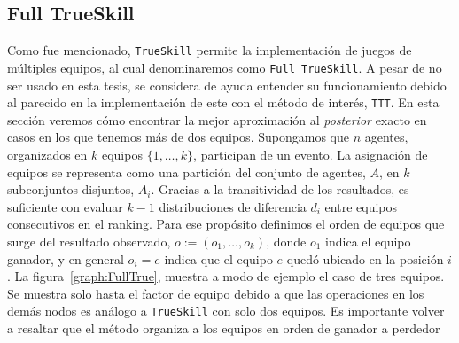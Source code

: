 \documentclass[11pt,twoside,spanish]{report} %
\begin{document}
\subsection{Full TrueSkill}\label{sec:iterative_posterior}
Como fue mencionado, \texttt{TrueSkill} permite la implementaci\'on de juegos de m\'ultiples equipos, al cual denominaremos como \texttt{Full TrueSkill}.
A pesar de no ser usado en esta tesis, se considera de ayuda entender su funcionamiento debido al parecido en la implementaci\'on de este con el m\'etodo de inter\'es, \texttt{TTT}.
En esta secci\'on veremos c\'omo encontrar la mejor aproximaci\'on al \textit{posterior} exacto en casos en los que tenemos m\'as de dos equipos.
Supongamos que $n$ agentes, organizados en $k$ equipos $\{1, \dots, k\}$, participan de un evento. 
La asignaci\'on de equipos se representa como una partici\'on del conjunto de agentes, $A$, en $k$ subconjuntos disjuntos, $A_i$.
Gracias a la transitividad de los resultados, es suficiente con evaluar $k-1$ distribuciones de diferencia $d_i$ entre equipos consecutivos en el ranking.
Para ese prop\'osito definimos el orden de equipos que surge del resultado observado, $o := (o_1, \dots, o_k)$, donde $o_1$ indica el equipo ganador, y en general $o_i = e$ indica que el equipo $e$ qued\'o ubicado en la posici\'on $i$.
La figura~\ref{graph:FullTrue}, muestra a modo de ejemplo el caso de tres equipos.
Se muestra solo hasta el factor de equipo debido a que las operaciones en los dem\'as nodos es an\'alogo a \texttt{TrueSkill} con solo dos equipos.
Es importante volver a resaltar que el m\'etodo organiza a los equipos en orden de ganador a perdedor


\end{document}
